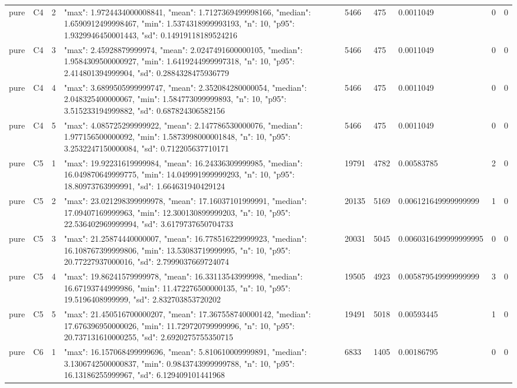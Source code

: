 \begin{tabular}{lllllllll}
pure & C4 & 2 & {"max": 1.9724434000008841, "mean": 1.7127369499998166, "median": 1.6590912499998467, "min": 1.5374318999993193, "n": 10, "p95": 1.9329946450001443, "sd": 0.14919118189524216} & 5466 & 475 & 0.0011049 & 0 & 0 \\
pure & C4 & 3 & {"max": 2.45928879999974, "mean": 2.0247491600000105, "median": 1.9584309500000927, "min": 1.6419244999997318, "n": 10, "p95": 2.414801394999904, "sd": 0.2884328475936779} & 5466 & 475 & 0.0011049 & 0 & 0 \\
pure & C4 & 4 & {"max": 3.6899505999999747, "mean": 2.352084280000054, "median": 2.048325400000067, "min": 1.584773099999893, "n": 10, "p95": 3.515233194999882, "sd": 0.687824306582156} & 5466 & 475 & 0.0011049 & 0 & 0 \\
pure & C4 & 5 & {"max": 4.085725299999922, "mean": 2.147786530000076, "median": 1.977156500000092, "min": 1.5873998000001848, "n": 10, "p95": 3.2532247150000084, "sd": 0.712205637710171} & 5466 & 475 & 0.0011049 & 0 & 0 \\
pure & C5 & 1 & {"max": 19.92231619999984, "mean": 16.24336309999985, "median": 16.049870649999775, "min": 14.049991999999293, "n": 10, "p95": 18.80973763999991, "sd": 1.664631940429124} & 19791 & 4782 & 0.00583785 & 2 & 0 \\
pure & C5 & 2 & {"max": 23.021298399999978, "mean": 17.16037101999991, "median": 17.09407169999963, "min": 12.300130899999203, "n": 10, "p95": 22.536402969999994, "sd": 3.6179737650704733} & 20135 & 5169 & 0.006121649999999999 & 1 & 0 \\
pure & C5 & 3 & {"max": 21.25874440000007, "mean": 16.778516229999923, "median": 16.108767399999806, "min": 13.53083719999995, "n": 10, "p95": 20.77227937000016, "sd": 2.7999037669724074} & 20031 & 5045 & 0.0060316499999999995 & 0 & 0 \\
pure & C5 & 4 & {"max": 19.86241579999978, "mean": 16.33113543999998, "median": 16.67193744999986, "min": 11.472276500000135, "n": 10, "p95": 19.5196408999999, "sd": 2.832703853720202} & 19505 & 4923 & 0.005879549999999999 & 3 & 0 \\
pure & C5 & 5 & {"max": 21.450516700000207, "mean": 17.367558740000142, "median": 17.676396950000026, "min": 11.729720799999996, "n": 10, "p95": 20.737131610000255, "sd": 2.6920275755350715} & 19491 & 5018 & 0.00593445 & 1 & 0 \\
pure & C6 & 1 & {"max": 16.157068499999696, "mean": 5.810610009999891, "median": 3.1306742500000837, "min": 0.9843743999999788, "n": 10, "p95": 16.13186255999967, "sd": 6.129409101441968} & 6833 & 1405 & 0.00186795 & 0 & 0 \\

\end{tabular}
